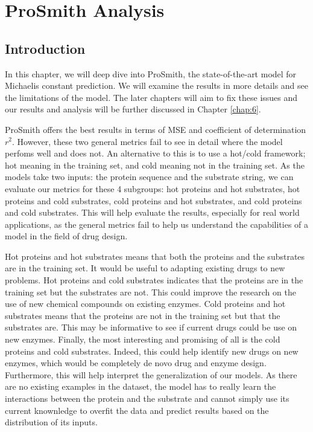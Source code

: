 
\chapter{ProSmith Analysis}
\label{chap:2}

\section{Introduction}

In this chapter, we will deep dive into ProSmith, the state-of-the-art model for Michaelis constant
prediction. We will examine the results in more details and see the limitations of the model. The later
chapters will aim to fix these issues and our results and analysis will be further discussed in 
Chapter \ref{chap:6}.

ProSmith offers the best results in terms of MSE and coefficient of determination $r^2$. However, 
these two general metrics fail to see in detail where the model perfoms well and does not. An
alternative to this is to use a hot/cold framework; hot meaning in the training set, and cold 
meaning not in the training set. As the models take two inputs: the protein sequence and 
the substrate string, we can evaluate our metrics for these 4 subgroups: hot proteins and hot substrates, 
hot proteins and cold substrates, cold proteins and hot substrates, and cold proteins and cold substrates. 
This will help evaluate the results, especially for real world applications, as the general metrics fail to help us understand the capabilities of a model in the field of drug design.

Hot proteins and hot substrates means that both the proteins and the substrates are in the training set. It would be useful to adapting existing drugs to new problems. Hot proteins and cold substrates indicates that the proteins are in the training set but the substrates are not. This could improve the research on the use of new chemical compounds on existing enzymes. Cold proteins and hot substrates means that the proteins are not in the training set but that the substrates are. This may be informative to see if current drugs could be use on new enzymes. Finally, the most interesting and promising of all is the cold proteins and cold substrates. Indeed, this could help identify new drugs on new enzymes, which would be completely de novo drug and enzyme design. Furthermore, this will help interpret the generalization of our models. As there are no existing examples in the dataset, the model has to really learn the interactions between the protein and the substrate and cannot simply use its current knownledge to overfit the data and predict results based on the distribution of its inputs.

